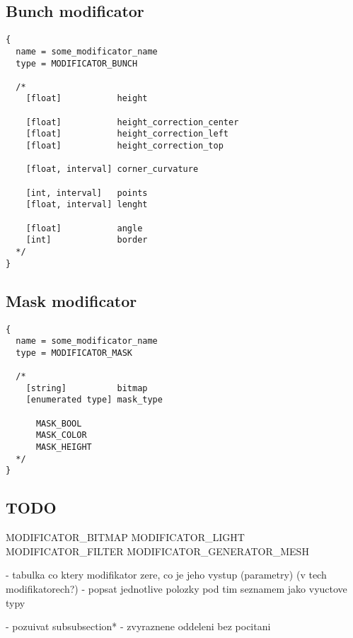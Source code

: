 \documentclass[9pt]{article}
\begin{document}
\subsection{Bunch modificator}

\begin{verbatim}
{
  name = some_modificator_name
  type = MODIFICATOR_BUNCH

  /*
    [float]           height
    
    [float]           height_correction_center
    [float]           height_correction_left
    [float]           height_correction_top      
    
    [float, interval] corner_curvature
    
    [int, interval]   points
    [float, interval] lenght
    
    [float]           angle
    [int]             border
  */
}
\end{verbatim}

\subsection{Mask modificator}

\begin{verbatim}
{
  name = some_modificator_name
  type = MODIFICATOR_MASK

  /*
    [string]          bitmap      
    [enumerated type] mask_type
  
      MASK_BOOL
      MASK_COLOR
      MASK_HEIGHT
  */
}
\end{verbatim}

\subsection{TODO}
MODIFICATOR\_BITMAP
MODIFICATOR\_LIGHT
MODIFICATOR\_FILTER
MODIFICATOR\_GENERATOR\_MESH

- tabulka co ktery modifikator zere, co je jeho vystup (parametry)
(v tech modifikatorech?)
- popsat jednotlive polozky pod tim seznamem jako
vyuctove typy

- pozuivat subsubsection*{} - zvyraznene oddeleni bez pocitani
\end{document}
